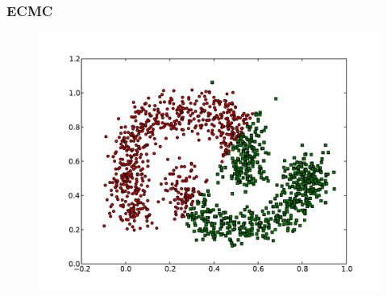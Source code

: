 \documentclass{beamer}
\begin{document}
\begin{frame}
\frametitle{ECMC}
    \begin{figure}[]
    \includegraphics[scale=0.3]{ECMC_half-moons.pdf}
    \end{figure}
\end{frame}
\end{document}
